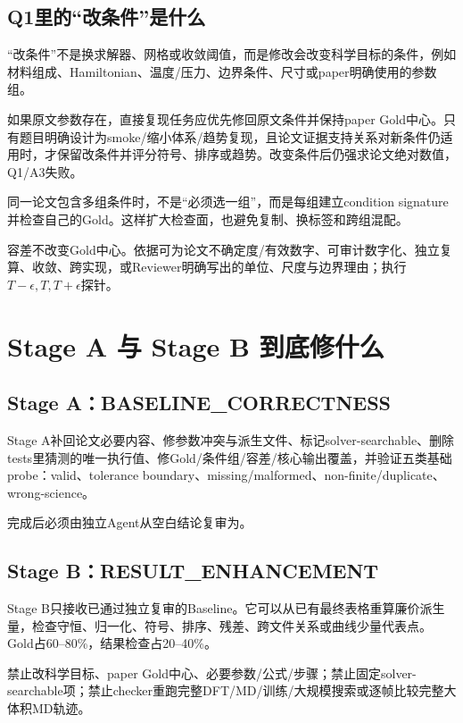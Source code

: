 \documentclass[11pt,fontset=none]{ctexart}
\newcommand{\code}[1]{\texttt{\detokenize{#1}}}
\begin{document}
\subsection{Q1里的“改条件”是什么}

“改条件”不是换求解器、网格或收敛阈值，而是修改会改变科学目标的条件，例如材料组成、Hamiltonian、温度/压力、边界条件、尺寸或paper明确使用的参数组。

如果原文参数存在，直接复现任务应优先修回原文条件并保持paper Gold中心。只有题目明确设计为smoke/缩小体系/趋势复现，且论文证据支持关系对新条件仍适用时，才保留改条件并评分符号、排序或趋势。改变条件后仍强求论文绝对数值，Q1/A3失败。

\begin{judgementbox}\small
同一论文包含多组条件时，不是“必须选一组”，而是每组建立condition signature并检查自己的Gold。这样扩大检查面，也避免复制、换标签和跨组混配。
\end{judgementbox}

容差不改变Gold中心。依据可为论文不确定度/有效数字、可审计数字化、独立复算、收敛、跨实现，或Reviewer明确写出的单位、尺度与边界理由；执行$T-\epsilon,T,T+\epsilon$探针。

\section{Stage A 与 Stage B 到底修什么}

\subsection{Stage A：BASELINE\_CORRECTNESS}

Stage A补回论文必要内容、修参数冲突与派生文件、标记solver-searchable、删除tests里猜测的唯一执行值、修Gold/条件组/容差/核心输出覆盖，并验证五类基础probe：valid、tolerance boundary、missing/malformed、non-finite/duplicate、wrong-science。

完成后必须由独立Agent从空白结论复审为\code{BASELINE_CORRECT}。

\subsection{Stage B：RESULT\_ENHANCEMENT}

Stage B只接收已通过独立复审的Baseline。它可以从已有最终表格重算廉价派生量，检查守恒、归一化、符号、排序、残差、跨文件关系或曲线少量代表点。Gold占60--80\%，结果检查占20--40\%。

禁止改科学目标、paper Gold中心、必要参数/公式/步骤；禁止固定solver-searchable项；禁止checker重跑完整DFT/MD/训练/大规模搜索或逐帧比较完整大体积MD轨迹。
\end{document}
